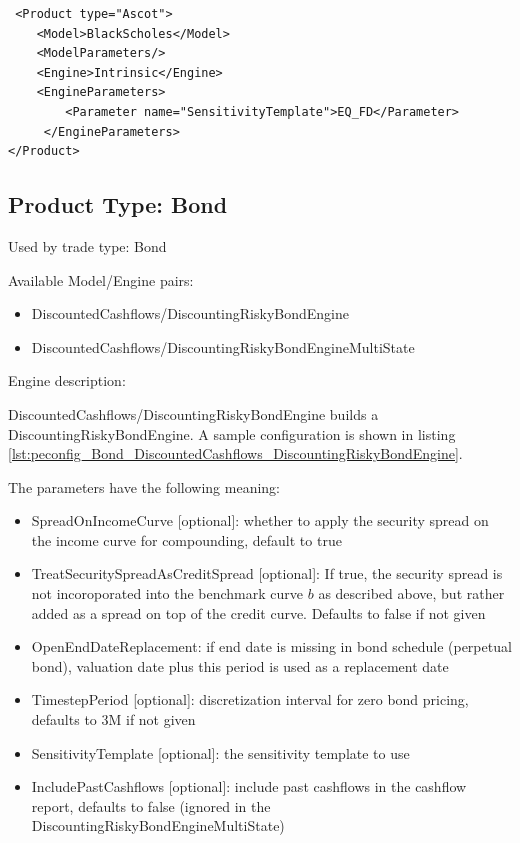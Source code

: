 \begin{longlisting}
\begin{verbatim}
 <Product type="Ascot">
    <Model>BlackScholes</Model>
    <ModelParameters/>
    <Engine>Intrinsic</Engine>
    <EngineParameters>
        <Parameter name="SensitivityTemplate">EQ_FD</Parameter>
     </EngineParameters>
</Product>
\end{verbatim}
\caption{Configuration for Product Ascot, Model: BlackScholes, Engine: Intrinsic}
\label{lst:peconfig_Ascot_BlackScholes_Intrinsic}
\end{longlisting}

\subsection{Product Type: Bond}

Used by trade type: Bond

Available Model/Engine pairs:

\begin{itemize}
\item DiscountedCashflows/DiscountingRiskyBondEngine
\item DiscountedCashflows/DiscountingRiskyBondEngineMultiState
\end{itemize}

Engine description:

DiscountedCashflows/DiscountingRiskyBondEngine builds a DiscountingRiskyBondEngine. A sample configuration is shown
in listing \ref{lst:peconfig_Bond_DiscountedCashflows_DiscountingRiskyBondEngine}.

The parameters have the following meaning:

\begin{itemize}
\item SpreadOnIncomeCurve [optional]: whether to apply the security spread on the income curve for compounding, default to true
\item TreatSecuritySpreadAsCreditSpread [optional]: If true, the security spread is not incoroporated into the benchmark curve $b$
  as described above, but rather added as a spread on top of the credit curve. Defaults to false if not given
\item OpenEndDateReplacement: if end date is missing in bond schedule (perpetual bond), valuation date plus this period is used as a replacement date
\item TimestepPeriod [optional]: discretization interval for zero bond pricing, defaults to 3M if not given
\item SensitivityTemplate [optional]: the sensitivity template to use
\item IncludePastCashflows [optional]: include past cashflows in the cashflow report, defaults to false (ignored in the DiscountingRiskyBondEngineMultiState)
\end{itemize}

